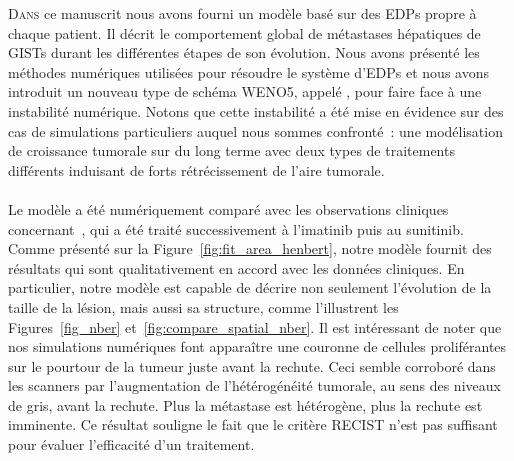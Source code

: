 \documentclass[main.tex]{subfiles}
\begin{document}


\lettrine{D}{ans} ce manuscrit nous avons fourni un modèle basé sur des EDPs propre à chaque patient. Il décrit le comportement global de métastases hépatiques de GISTs durant les différentes étapes de son évolution. Nous avons présenté les méthodes numériques utilisées pour résoudre le système d'EDPs et nous avons introduit un nouveau type de schéma WENO5, appelé \twinweno, pour faire face à une instabilité numérique. Notons que cette instabilité a été mise en évidence sur des cas de simulations particuliers auquel nous sommes confronté~: une modélisation de croissance tumorale sur du long terme avec deux types de traitements différents induisant de forts rétrécissement de l'aire tumorale. 


\paragraph{}
Le modèle a été numériquement comparé avec les observations cliniques concernant~\Nber, qui a été traité successivement à l'imatinib puis au sunitinib.
Comme présenté sur la 
Figure~\ref{fig:fit_area_henbert}, notre modèle fournit des résultats qui sont qualitativement en accord avec les données cliniques. En particulier, notre modèle est capable de décrire non seulement l'évolution de la taille de la lésion, mais aussi sa structure, comme l'illustrent les Figures~\ref{fig_nber} et~\ref{fig:compare_spatial_nber}. 
Il est intéressant de noter que nos simulations numériques font apparaître une couronne de cellules proliférantes sur le pourtour de la tumeur juste avant la rechute. Ceci semble corroboré dans les scanners par l'augmentation de l'hétérogénéité tumorale, au sens des niveaux de gris, avant la rechute. Plus la métastase est hétérogène, plus la rechute est imminente. Ce résultat souligne le fait que le critère RECIST n'est pas suffisant pour évaluer l'efficacité d'un traitement.
\end{document}
